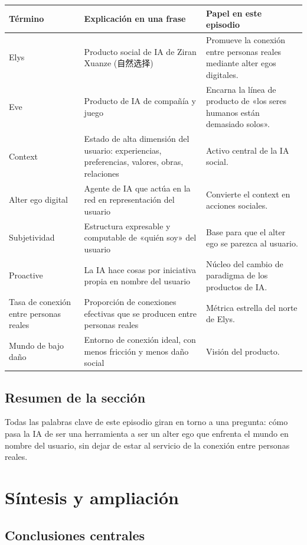 \documentclass[a4paper]{article}
\begin{document}
\begin{longtable}{p{}p{}p{}}
\toprule
Término & Explicación en una frase & Papel en este episodio \\
\midrule
Elys & Producto social de IA de Ziran Xuanze (自然选择) & Promueve la conexión entre personas reales mediante alter egos digitales. \\
Eve & Producto de IA de compañía y juego & Encarna la línea de producto de «los seres humanos están demasiado solos». \\
Context & Estado de alta dimensión del usuario: experiencias, preferencias, valores, obras, relaciones & Activo central de la IA social. \\
Alter ego digital & Agente de IA que actúa en la red en representación del usuario & Convierte el context en acciones sociales. \\
Subjetividad & Estructura expresable y computable de «quién soy» del usuario & Base para que el alter ego se parezca al usuario. \\
Proactive & La IA hace cosas por iniciativa propia en nombre del usuario & Núcleo del cambio de paradigma de los productos de IA. \\
Tasa de conexión entre personas reales & Proporción de conexiones efectivas que se producen entre personas reales & Métrica estrella del norte de Elys. \\
Mundo de bajo daño & Entorno de conexión ideal, con menos fricción y menos daño social & Visión del producto. \\
\bottomrule
\end{longtable}

\subsection{Resumen de la sección}

Todas las palabras clave de este episodio giran en torno a una pregunta: cómo pasa la IA de ser una herramienta a ser un alter ego que enfrenta el mundo en nombre del usuario, sin dejar de estar al servicio de la conexión entre personas reales.
\section{Síntesis y ampliación}

\subsection{Conclusiones centrales}
\end{document}
